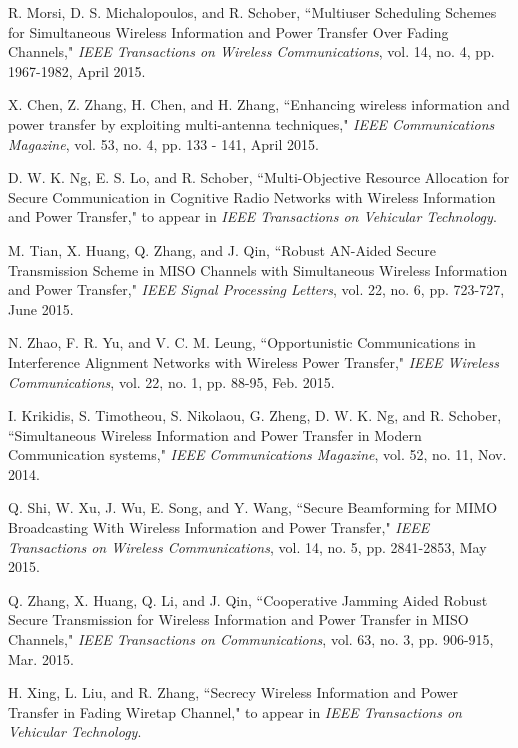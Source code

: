 \documentclass[twocolumn,10pt]{IEEEtran}
\begin{document}
\begin{thebibliography}{99}
 
R. Morsi, D. S. Michalopoulos, and R. Schober, 
``Multiuser Scheduling Schemes for Simultaneous Wireless Information and Power Transfer Over Fading Channels," \emph{IEEE Transactions on Wireless Communications},  vol.	14, no. 4, pp. 1967-1982, April 2015.

X. Chen, Z. Zhang, H. Chen, and H. Zhang, ``Enhancing wireless information and power transfer by exploiting multi-antenna techniques," 
\emph{IEEE Communications Magazine},  vol. 53, no. 4, pp. 133 - 141, April 2015. 

D. W. K. Ng, E. S. Lo, and R. Schober,  
``Multi-Objective Resource Allocation for Secure Communication in Cognitive Radio Networks with Wireless Information and Power Transfer," 
to appear in \emph{IEEE Transactions on Vehicular Technology}.  

M. Tian, X. Huang, Q. Zhang, and J. Qin, ``Robust AN-Aided Secure Transmission Scheme in MISO Channels with Simultaneous Wireless Information and Power Transfer," 
\emph{IEEE Signal Processing Letters},  vol. 22, no. 6, pp. 723-727, June 2015.

N. Zhao, F. R. Yu, and V. C. M. Leung, 
``Opportunistic Communications in Interference Alignment Networks with Wireless Power Transfer," \emph{IEEE Wireless Communications}, 
vol. 22, no. 1, pp. 88-95, Feb.  2015.

I. Krikidis, S. Timotheou, S. Nikolaou, G. Zheng, D. W. K. Ng, and R. Schober, ``Simultaneous Wireless Information and Power Transfer in Modern Communication systems," \emph{IEEE Communications Magazine}, 
vol. 52, no. 11, Nov. 2014.


Q. Shi, W. Xu, J. Wu, E. Song, and Y. Wang,  
``Secure Beamforming for MIMO Broadcasting With Wireless Information and Power Transfer," 
\emph{IEEE Transactions on Wireless Communications}, vol. 14, no. 5, pp. 2841-2853, May 2015.

Q. Zhang, X. Huang, Q. Li, and J. Qin, 
``Cooperative Jamming Aided Robust Secure Transmission for Wireless Information and Power Transfer in MISO Channels," 
\emph{IEEE Transactions on Communications},  vol. 63, no. 3, pp. 906-915, Mar. 2015.

H. Xing, L. Liu,  and R. Zhang,  
``Secrecy Wireless Information and Power Transfer in Fading Wiretap Channel," 
to appear in \emph{IEEE Transactions on  Vehicular Technology}. 


\end{thebibliography}
\end{document}
